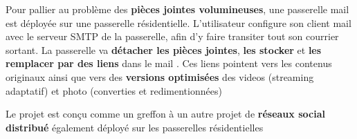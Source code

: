 \documentclass[portrait,final,a0paper]{baposter}
\begin{document}
\begin{poster}
{\begin{multicols}{2}
\begin{minipage}{0.5\textwidth}
\begin{center}
				\end{center}
				
			\end{minipage}
			
				
			
			Pour pallier au problème des \textbf{pièces jointes volumineuses}, une passerelle mail est déployée sur une passerelle résidentielle.
			L'utilisateur configure son client mail avec le serveur SMTP de la passerelle, afin d'y faire transiter tout son courrier sortant. 
			La passerelle va \textbf{détacher les pièces jointes}, \textbf{les stocker} et \textbf{les remplacer par des liens} dans le mail . Ces liens pointent vers les contenus originaux ainsi que vers des \textbf{versions optimisées} des videos (streaming adaptatif) et photo (converties et redimentionnées)
			
			Le projet est conçu comme un greffon à un autre projet de \textbf{réseaux social distribué } également déployé sur les passerelles résidentielles
			
			
	\end{multicols}
    }
 
\end{poster}
\end{document}
